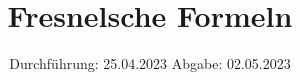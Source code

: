 

\subject{VERSUCH NUMMER 407}
\title{Fresnelsche Formeln}
\date{
  Durchführung: 25.04.2023
  \hspace{3em}
  Abgabe: 02.05.2023
}



\maketitle
\thispagestyle{empty}
\tableofcontents
\newpage
\setcounter{page}{1}







\newpage
\printbibliography
\nocite{ap407}
\nocite{matplotlib}
\nocite{numpy}
\nocite{scipy}
\nocite{uncertainties}
\nocite{reback2020pandas}

\newpage
%
%
%


